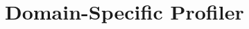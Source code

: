 \documentclass[runningheads]{llncs}
\newcommand{\ab}[1]{\nb{Alexandre}{blue}{#1}}
\newcommand{\lr}[1]{\nb{Lukas}{orange}{#1}}
\newcommand{\jr}[1]{\nb{Jorge}{cyan}{#1}}
\newcommand{\seclabel}[1]{\label{sec:#1}}
\begin{document}

\section{Domain-Specific Profiler}\seclabel{profiler}

% 
% 
% 
% 
% 
% 
% 
% 
% 
\end{document}
